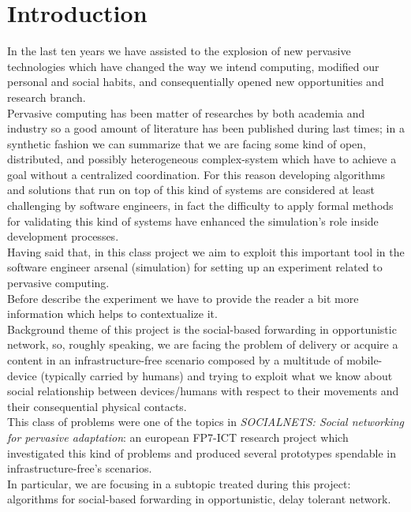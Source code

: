 \section{Introduction}
\label{intro}

In the last ten years we have assisted to the explosion of new pervasive technologies which have changed the way we intend computing, modified our personal and social habits, and consequentially opened new opportunities and research branch.\\
Pervasive computing has been matter of researches by both academia and industry so a good amount of literature has been published during last times; in a synthetic fashion we can summarize that we are facing some kind of open, distributed, and possibly heterogeneous complex-system which have to achieve a goal without a centralized coordination. For this reason developing algorithms and solutions that run on top of this kind of systems are considered at least challenging by software engineers, in fact the difficulty to apply formal methods for validating this kind of systems have enhanced the simulation's role inside development processes. \\
Having said that, in this class project we aim to exploit this important tool in the software engineer arsenal (simulation) for setting up an experiment related to pervasive computing.\\
Before describe the experiment we have to provide the reader a bit more information which helps to contextualize it. \\
Background theme of this project is the social-based forwarding in opportunistic network, so, roughly speaking, we are facing the problem of delivery or acquire a content in an infrastructure-free scenario composed by a multitude of mobile-device (typically carried by humans) and trying to exploit what we know about social relationship between devices/humans with respect to their movements and their consequential physical contacts. \\
This class of problems were one of the topics in \emph{SOCIALNETS: Social networking for pervasive adaptation}\cite{socialnetseu}: an european FP7-ICT research project which investigated this kind of problems and produced several prototypes spendable in infrastructure-free's scenarios. \\
In particular, we are focusing in a subtopic treated during this project: algorithms for social-based forwarding in opportunistic, delay tolerant network. \\
